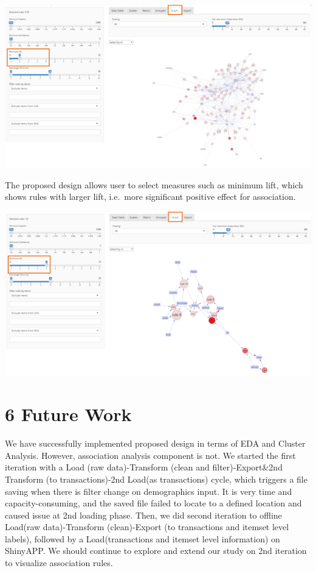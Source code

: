 \documentclass{acm_proc_article-sp}
\begin{document}
\begin{center}\includegraphics[width=1\linewidth]{14} \end{center}

The proposed design allows user to select measures such as minimum lift,
which shows rules with larger lift, i.e.~more significant positive
effect for association.

\begin{center}\includegraphics[width=1\linewidth]{15} \end{center}

\hypertarget{future-work}{%
\section{6 Future Work}\label{future-work}}

We have successfully implemented proposed design in terms of EDA and
Cluster Analysis. However, association analysis component is not. We
started the first iteration with a Load (raw data)-Transform (clean and
filter)-Export\&2nd Transform (to transactions)-2nd Load(as
transactions) cycle, which triggers a file saving when there is filter
change on demographics input. It is very time and capacity-consuming,
and the saved file failed to locate to a defined location and caused
issue at 2nd loading phase. Then, we did second iteration to offline
Load(raw data)-Transform (clean)-Export (to transactions and itemset
level labels), followed by a Load(transactions and itemset level
information) on ShinyAPP. We should continue to explore and extend our
study on 2nd iteration to visualize association rules.
\end{document}
